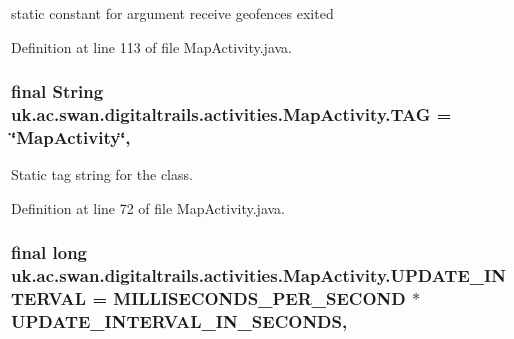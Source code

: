 static constant for argument receive geofences exited 



Definition at line 113 of file Map\+Activity.\+java.

\hypertarget{classuk_1_1ac_1_1swan_1_1digitaltrails_1_1activities_1_1_map_activity_a602c8e98476fa0a148b49d61f62501dc}{
\subsubsection[{T\+A\+G}]{\setlength{\rightskip}{0pt plus 5cm}final String uk.\+ac.\+swan.\+digitaltrails.\+activities.\+Map\+Activity.\+T\+A\+G = \char`\"{}Map\+Activity\char`\"{}\hspace{0.3cm}{\ttfamily [static]}, {\ttfamily [private]}}}\label{classuk_1_1ac_1_1swan_1_1digitaltrails_1_1activities_1_1_map_activity_a602c8e98476fa0a148b49d61f62501dc}


Static tag string for the class. 



Definition at line 72 of file Map\+Activity.\+java.

\hypertarget{classuk_1_1ac_1_1swan_1_1digitaltrails_1_1activities_1_1_map_activity_aef4c6da45d48652634a6586356192fe3}{
\subsubsection[{U\+P\+D\+A\+T\+E\+\_\+\+I\+N\+T\+E\+R\+V\+A\+L}]{\setlength{\rightskip}{0pt plus 5cm}final long uk.\+ac.\+swan.\+digitaltrails.\+activities.\+Map\+Activity.\+U\+P\+D\+A\+T\+E\+\_\+\+I\+N\+T\+E\+R\+V\+A\+L = {\bf M\+I\+L\+L\+I\+S\+E\+C\+O\+N\+D\+S\+\_\+\+P\+E\+R\+\_\+\+S\+E\+C\+O\+N\+D} $\ast$ {\bf U\+P\+D\+A\+T\+E\+\_\+\+I\+N\+T\+E\+R\+V\+A\+L\+\_\+\+I\+N\+\_\+\+S\+E\+C\+O\+N\+D\+S}\hspace{0.3cm}{\ttfamily [static]}, {\ttfamily [private]}}}\label{classuk_1_1ac_1_1swan_1_1digitaltrails_1_1activities_1_1_map_activity_aef4c6da45d48652634a6586356192fe3}


